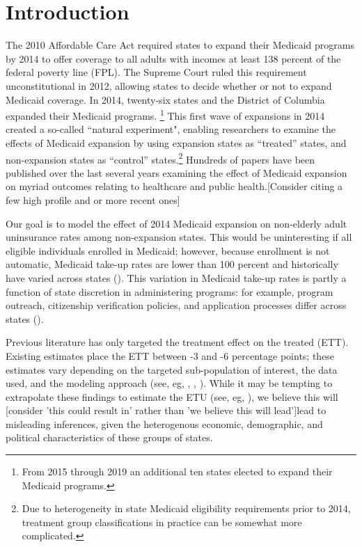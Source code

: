 \documentclass[final]{article}
\begin{document}
\maketitle

\section{Introduction}

The 2010 Affordable Care Act required states to expand their Medicaid programs by 2014 to offer coverage to all adults with incomes at least 138 percent of the federal poverty line (FPL). The Supreme Court ruled this requirement unconstitutional in 2012, allowing states to decide whether or not to expand Medicaid coverage. In 2014, twenty-six states and the District of Columbia expanded their Medicaid programs. \footnote{From 2015 through 2019 an additional ten states elected to expand their Medicaid programs.} This first wave of expansions in 2014 created a so-called ``natural experiment", enabling researchers to examine the effects of Medicaid expansion by using expansion states as ``treated'' states, and non-expansion states as ``control'' states.\footnote{Due to heterogeneity in state Medicaid eligibility requirements prior to 2014, treatment group classifications in practice can be somewhat more complicated.} Hundreds of papers have been published over the last several years examining the effect of Medicaid expansion on myriad outcomes relating to healthcare and public health.[Consider citing a few high profile and or more recent ones]

Our goal is to model the effect of 2014 Medicaid expansion on non-elderly adult uninsurance rates among non-expansion states. This would be uninteresting if all eligible individuals enrolled in Medicaid; however, because enrollment is not automatic, Medicaid take-up rates are lower than 100 percent and historically have varied across states (\cite{sommers2012understanding}). This variation in Medicaid take-up rates is partly a function of state discretion in administering programs: for example, program outreach, citizenship verification policies, and application processes differ across states (\cite{courtemanche2017early}). 

Previous literature has only targeted the treatment effect on the treated (ETT). Existing estimates place the ETT between -3 and -6 percentage points; these estimates vary depending on the targeted sub-population of interest, the data used, and the modeling approach (see, eg, \cite{courtemanche2017early}, \cite{kaestner2017effects}, \cite{frean2017premium}). While it may be tempting to extrapolate these findings to estimate the ETU (see, eg, \cite{miller2019medicaid}), we believe this will [consider 'this could result in' rather than 'we believe this will lead']lead to misleading inferences, given the heterogenous economic, demographic, and political characteristics of these groups of states.
\end{document}
